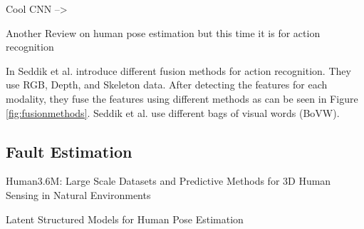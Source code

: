 Cool CNN --> \cite{ElboushakiAbdessamad2020MAmf}

Another Review on human pose estimation but this time it is for action recognition \cite{ReviewHPEforActionRecognition}

In \cite{Seddik2017} Seddik et al. introduce different fusion methods for action recognition. They use RGB, Depth, and Skeleton data. After detecting the features for each modality, they fuse the features using different methods as can be seen in Figure \ref{fig:fusionmethods}. Seddik et al. use different bags of visual words (BoVW).

\subsection{Fault Estimation}

Human3.6M: Large Scale Datasets and Predictive Methods for 3D Human Sensing in Natural Environments \cite{h36m_pami}


Latent Structured Models for Human Pose Estimation \cite{IonescuSminchisescu11} 
